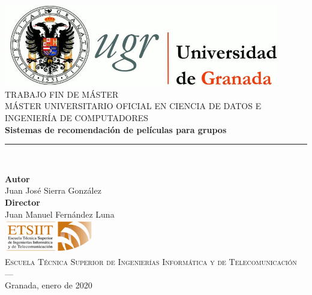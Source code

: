 \begin{titlepage}
 
 
\newlength{\centeroffset}
\setlength{\centeroffset}{-0.5\oddsidemargin}
\addtolength{\centeroffset}{0.5\evensidemargin}
\thispagestyle{empty}

\noindent\hspace*{\centeroffset}\begin{minipage}{\textwidth}

\centering
\includegraphics[width=0.9\textwidth]{imagenes/logo_ugr.jpg}\\[1.4cm]

\textsc{ \Large TRABAJO FIN DE MÁSTER\\[0.2cm]}
\textsc{MÁSTER UNIVERSITARIO OFICIAL EN CIENCIA DE DATOS E INGENIERÍA DE COMPUTADORES}\\[1cm]
% 
{\Huge\bfseries Sistemas de recomendación de películas para grupos\\
}
\noindent\rule[-1ex]{\textwidth}{3pt}\\[3.5ex]
\end{minipage}

\vspace{2.5cm}
\noindent\hspace*{\centeroffset}\begin{minipage}{\textwidth}
\centering

\textbf{Autor}\\ {Juan José Sierra González}\\[2.5ex]
\textbf{Director}\\
{Juan Manuel Fernández Luna}\\[2cm]
\includegraphics[width=0.3\textwidth]{imagenes/etsiit_logo.png}\\[0.1cm]
\textsc{Escuela Técnica Superior de Ingenierías Informática y de Telecomunicación}\\
\textsc{---}\\
Granada, enero de 2020
\end{minipage}
\end{titlepage}


